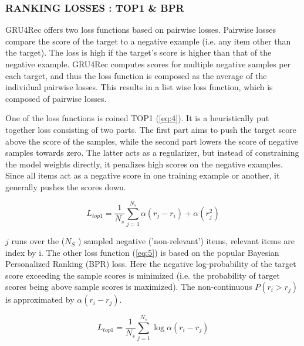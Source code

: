 \documentclass{article} %
\begin{document}
\subsubsection{RANKING LOSSES : TOP1 & BPR}
GRU4Rec offers two loss functions based on pairwise losses. Pairwise losses compare the score of the target to a negative example (i.e. any item other than the target). The loss is high if the target’s score is higher than that of the negative example. GRU4Rec computes scores for multiple negative samples per each target, and thus the loss function is composed as the average of the individual
pairwise losses. This results in a list wise loss function, which is composed of pairwise losses.

One of the loss functions is coined TOP1 (\ref{eq:4}). It is a heuristically put together loss consisting of two
parts. The first part aims to push the target score above the score of the samples, while the second
part lowers the score of negative samples towards zero. The latter acts as a regularizer, but instead
of constraining the model weights directly, it penalizes high scores on the negative examples. Since
all items act as a negative score in one training example or another, it generally pushes the scores
down.

\begin{equation}\label{eq:4}
    L_{top1} =  \frac{1}{N_s}  \sum_{j=1}^{N_s} \alpha (r_j - r_i) + \alpha (r^{2}_{j})
\end{equation}

$j$ runs over the ($N_S$ ) sampled negative (’non-relevant’) items, relevant items are index by i. The other loss function (\ref{eq:5}) is based on the popular Bayesian Personalized Ranking (BPR) \cite{rendle2012bpr} loss. Here the negative log-probability of the target score exceeding the sample scores is minimized (i.e. the probability of target scores being above sample scores is maximized). The non-continuous $P (r_i > r_j )$ is approximated by $\alpha(r_i − r_j ).$

\begin{equation}\label{eq:5}
    L_{top1} =  \frac{1}{N_s}  \sum_{j=1}^{N_s} \log \alpha(r_i - r_j)
\end{equation}
\end{document}
